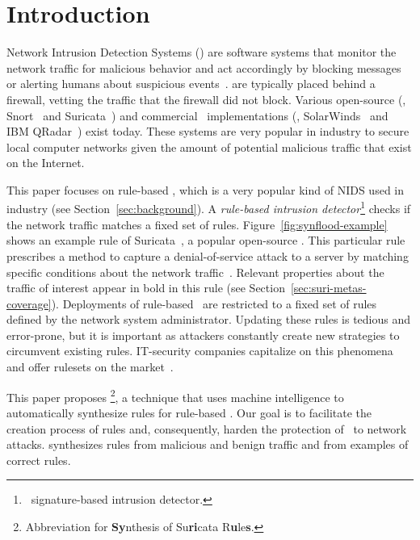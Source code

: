 \documentclass[sigconf,review, anonymous]{acmart}
\begin{document}
\maketitle

\section{Introduction}
\label{sec:intro}

Network Intrusion Detection Systems (\nids{}) are software systems
that monitor the network traffic for malicious behavior and act
accordingly by blocking messages or alerting humans about suspicious
events~\cite{Mitchell:2014:SID:2597757.2542049}. \nids{} are typically
placed behind a firewall, vetting the traffic that the firewall did
not block. Various open-source (\eg{}, Snort~\cite{snort} and
Suricata~\cite{suricata}) and commercial \nids\ implementations (\eg{},
SolarWinds~\cite{solarwinds} and IBM QRadar~\cite{qradar}) exist
today. These systems are very popular in industry to secure local
computer networks given the amount of potential malicious traffic that
exist on the Internet.

This paper focuses on rule-based \nids{}, which is a very popular kind
of NIDS used in industry (see Section~\ref{sec:background}). A
\emph{rule-based intrusion detector}\footnote{\aka\ signature-based
  intrusion detector.} checks if the network traffic matches a fixed
set of rules. Figure~\ref{fig:synflood-example} shows an example rule
of Suricata~\cite{suricata}, a popular open-source \nids{}. This
particular rule prescribes a method to capture a denial-of-service
attack to a server by matching specific conditions about the network
traffic~\cite{understanding-dos}. Relevant properties about the
traffic of interest appear in bold in this rule (see
Section~\ref{sec:suri-metas-coverage}). Deployments of rule-based
\nids\ are restricted to a fixed set of rules defined by the network
system administrator. Updating these rules is tedious and error-prone,
but it is important as attackers constantly create new strategies to
circumvent existing rules. IT-security companies capitalize on this
phenomena and offer rulesets on the
market~\cite{proofpoint-etpro,snort-rule-subscriptions}.

This paper proposes \tname{}\footnote{Abbreviation for
  \textbf{Sy}nthesis of Su\textbf{ri}cata R\textbf{u}le\textbf{s}.}, a
technique that uses machine intelligence to automatically synthesize
rules for rule-based \nids. Our goal is to facilitate the creation
process of rules and, consequently, harden the protection of \nids\ to
network attacks. \tname{} synthesizes rules from malicious and benign
traffic and from examples of correct rules.
\end{document}

